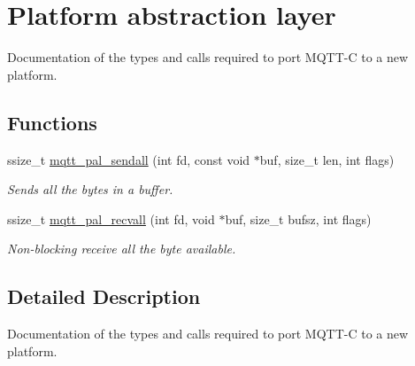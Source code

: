 \hypertarget{group__pal}{}\section{Platform abstraction layer}
\label{group__pal}


Documentation of the types and calls required to port M\+Q\+T\+T-\/C to a new platform.  


\subsection*{Functions}
\begin{DoxyCompactItemize}
\item 
ssize\+\_\+t \hyperlink{group__pal_gac8dd7d5af889f5933dda733007adb9a3}{mqtt\+\_\+pal\+\_\+sendall} (int fd, const void $\ast$buf, size\+\_\+t len, int flags)
\begin{DoxyCompactList}\small\item\em Sends all the bytes in a buffer. \end{DoxyCompactList}\item 
ssize\+\_\+t \hyperlink{group__pal_ga620d6ab20694c9b4d99293a47491004e}{mqtt\+\_\+pal\+\_\+recvall} (int fd, void $\ast$buf, size\+\_\+t bufsz, int flags)
\begin{DoxyCompactList}\small\item\em Non-\/blocking receive all the byte available. \end{DoxyCompactList}\end{DoxyCompactItemize}


\subsection{Detailed Description}
Documentation of the types and calls required to port M\+Q\+T\+T-\/C to a new platform. 


